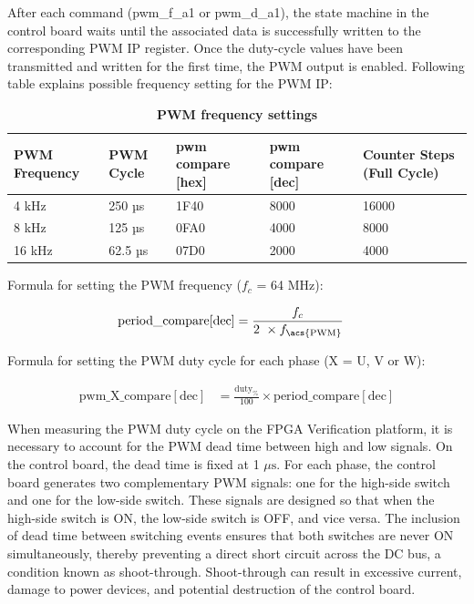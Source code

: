 After each command (pwm\_f\_a1 or pwm\_d\_a1), the state machine in the control board waits until the associated data is successfully written to the corresponding \acs{PWM} \acs{IP} register. Once the duty-cycle values have been transmitted and written for the first time, the \acs{PWM} output is enabled. Following table explains possible frequency setting for the \acs{PWM} \acs{IP}: 

\begin{table}[htbp]
	\centering
	\caption{\textbf{\acs{PWM} frequency settings}}
	\begin{tabular}{|p{2.5cm}|p{2cm}|p{2.5cm}|p{2.5cm}|p{3cm}|}
		\hline
		\textbf{\acs{PWM} Frequency} & 
		\textbf{\acs{PWM} Cycle} & 
		\textbf{pwm compare [hex]} & 
		\textbf{pwm compare [dec]} & 
		\textbf{Counter Steps (Full Cycle)} \\ \hline
		
		4 kHz  & 250 µs  & 1F40 & 8000 & 16000 \\ \hline
		8 kHz  & 125 µs  & 0FA0 & 4000 & 8000  \\ \hline
		16 kHz & 62.5 µs & 07D0 & 2000 & 4000  \\ \hline
	\end{tabular}
\end{table}

Formula for setting the \acs{PWM} frequency ($f_c$ = 64 MHz):

\begin{align*}
	\text{period\_compare}[\text{dec}] 
	&= \frac{f_c}{2\ \times f_{\text{\acs{PWM}}}}
\end{align*}

Formula for setting the \acs{PWM} duty cycle for each phase  (X = U, V or W): 

\begin{align*}
	\text{pwm\_X\_compare}[\text{dec}] 
	&= \frac{\text{duty}_\%}{100} \times \text{period\_compare}[\text{dec}]
\end{align*}

When measuring the \acs{PWM} duty cycle on the \acs{FPGA} Verification platform, it is necessary to account for the \acs{PWM} dead time between high and low signals. On the control board, the dead time is fixed at 1 $\mu\text{s}$. For each phase, the control board generates two complementary \acs{PWM} signals: one for the high-side switch and one for the low-side switch. These signals are designed so that when the high-side switch is ON, the low-side switch is OFF, and vice versa. The inclusion of dead time between switching events ensures that both switches are never ON simultaneously, thereby preventing a direct short circuit across the \acs{DC} bus, a condition known as shoot-through. Shoot-through can result in excessive current, damage to power devices, and potential destruction of the control board.

